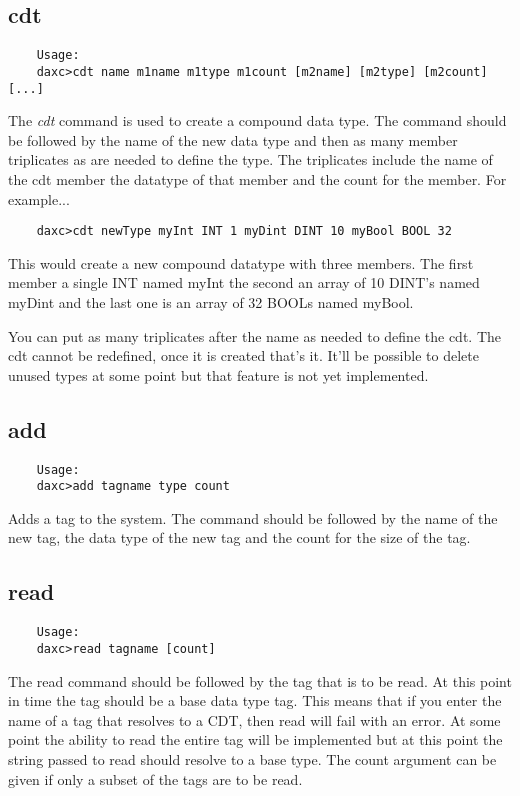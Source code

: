 	\subsection{cdt}
	\begin{verbatim}
	Usage:
	daxc>cdt name m1name m1type m1count [m2name] [m2type] [m2count] [...]
	\end{verbatim}
	The \textit{cdt} command is used to create a compound data type.  The command
	should be followed by the name of the new data type and then as many member
	triplicates as are needed to define the type.  The triplicates include the name
	of the cdt member the datatype of that member and the count for the member.  For
	example...
	
	\begin{verbatim}
	daxc>cdt newType myInt INT 1 myDint DINT 10 myBool BOOL 32
	\end{verbatim}
	
	This would create a new compound datatype with three members.  The first member
	a single INT named myInt the second an array of 10 DINT's named myDint and the
	last one is an array of 32 BOOLs named myBool.
	
	You can put as many triplicates after the name as needed to define the cdt.  The
	cdt cannot be redefined, once it is created that's it.  It'll be possible to
	delete unused types at some point but that feature is not yet implemented.
	
	\subsection{add}
	\begin{verbatim}
	Usage:
	daxc>add tagname type count
	\end{verbatim}
	
	Adds a tag to the system.  The command should be followed by the name of the new
	tag, the data type of the new tag and the count for the size of the tag.
	
	\subsection{read}
	\begin{verbatim}
	Usage:
	daxc>read tagname [count]
	\end{verbatim}
	
	The read command should be followed by the tag that is to be read.  At this
	point in time the tag should be a base data type tag.  This means that if you
	enter the name of a tag that resolves to a CDT, then read will fail with an
	error.  At some point the ability to read the entire tag will be implemented but
	at this point the string passed to read should resolve to a base type.  The
	count argument can be given if only a subset of the tags are to be read.
	
